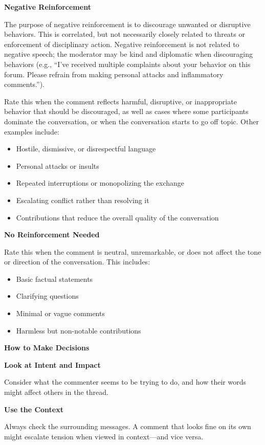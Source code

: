 \documentclass[11pt]{article}
\theoremstyle{definition}
\theoremstyle{plain}
\begin{document}
\textbf{Negative Reinforcement}

The purpose of negative reinforcement is to discourage unwanted or disruptive behaviors. This is correlated, but not necessarily closely related to threats or enforcement of disciplinary action. Negative reinforcement is not related to negative speech; the moderator may be kind and diplomatic when discouraging behaviors (e.g., ``I've received multiple complaints about your behavior on this forum. Please refrain from making personal attacks and inflammatory comments.'').

Rate this when the comment reflects harmful, disruptive, or inappropriate behavior that should be discouraged, as well as cases where some participants dominate the conversation, or when the conversation starts to go off topic. Other examples include:
\begin{itemize}
	\item Hostile, dismissive, or disrespectful language
	\item Personal attacks or insults
	\item Repeated interruptions or monopolizing the exchange
	\item Escalating conflict rather than resolving it
	\item Contributions that reduce the overall quality of the conversation
\end{itemize}

\textbf{No Reinforcement Needed}

Rate this when the comment is neutral, unremarkable, or does not affect the tone or direction of the conversation. This includes:
\begin{itemize}
	\item Basic factual statements
	\item Clarifying questions
	\item Minimal or vague comments
	\item Harmless but non-notable contributions
\end{itemize}

\textbf{How to Make Decisions}

\textbf{Look at Intent and Impact}

Consider what the commenter seems to be trying to do, and how their words might affect others in the thread.

\textbf{Use the Context}

Always check the surrounding messages. A comment that looks fine on its own might escalate tension when viewed in context—and vice versa.
\end{document}
